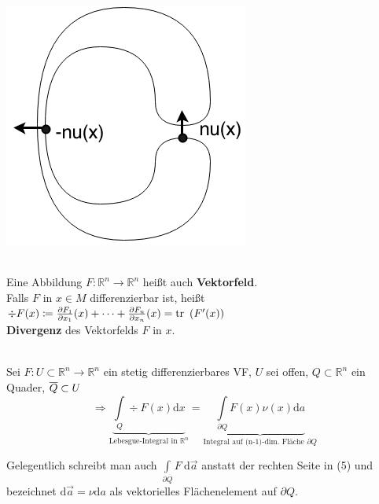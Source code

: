 \includegraphics[scale=0.3]{pictures/007-03}

\begin{definition}
    \mbox{} \\
    Eine Abbildung $F: \mathbb{R}^n \rightarrow \mathbb{R}^n $ heißt auch
    \textbf{Vektorfeld}.\\
    Falls $F$ in $x \in M $ differenzierbar ist, heißt \\
    $\div F(x) \coloneqq \frac{\partial{F_1}}{\partial{x_1}}(x) + \cdots + \frac{\partial{F_n}}{\partial{x_n}}(x) =
    \mathrm{tr\ }\left(F'(x)\right) $\\
    \textbf{Divergenz} des Vektorfelds $F$ in $x$.
\end{definition}

\begin{satz}
\mbox{} \\
Sei $F: U \subset \mathbb{R}^n \rightarrow \mathbb{R}^n $ ein stetig differenzierbares VF,
$U$ sei offen, $Q \subset \mathbb{R}^n $ ein Quader, $\overline{Q} \subset U \\
$
\begin{equation}
    \Longrightarrow 
    \underbrace
        {\int\limits_Q \div  F(x) \mathrm{d}x
    }_{
        \text{Lebesgue-Integral in }\mathbb{R}^n}
    =
    \underbrace{
        \int\limits_{\partial Q} F(x) \nu(x) \mathrm{d}a
    }_{
        \text{Integral auf (n-1)-dim. Fläche } \partial Q
    }    
\end{equation}

\end{satz}

Gelegentlich schreibt man auch $\int\limits_{\partial Q} F \ \mathrm{d}\vec{a} $ anstatt
der rechten Seite in (5) und bezeichnet
$\mathrm{d}\vec{a} = \nu \mathrm{d}a $ als vektorielles Flächenelement auf
$\partial Q $.

